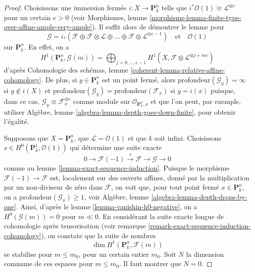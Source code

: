 \begin{proof}
Choisissons une immersion fermée $i : X \to \mathbf{P}^n_k$ telle que
$i^*\mathcal{O}(1) \cong \mathcal{L}^{\otimes e}$ pour un certain $e > 0$
(voir Morphismes, lemme
\ref{morphisms-lemma-finite-type-over-affine-ample-very-ample}).
Il suffit alors de démontrer le lemme pour
$$
\mathcal{G} =
i_*(\mathcal{F} \oplus \mathcal{F} \otimes \mathcal{L} \oplus \ldots
\oplus \mathcal{F} \otimes \mathcal{L}^{\otimes e - 1})
\quad\text{et}\quad \mathcal{O}(1)
$$
sur $\mathbf{P}^n_k$. En effet, on a
$$
H^1(\mathbf{P}^n_k, \mathcal{G}(m)) =
\bigoplus\nolimits_{j = 0, \ldots, e - 1}
H^1(X, \mathcal{F} \otimes \mathcal{L}^{\otimes j + me})
$$
d'après
Cohomologie des schémas, lemme \ref{coherent-lemma-relative-affine-cohomology}.
De plus, si $y \in \mathbf{P}^n_k$ est un point fermé, alors
$\text{profondeur}(\mathcal{G}_y) = \infty$ si $y \not \in i(X)$
et $\text{profondeur}(\mathcal{G}_y) = \text{profondeur}(\mathcal{F}_x)$
si $y = i(x)$ puisque, dans ce cas,
$\mathcal{G}_y \cong \mathcal{F}_x^{\oplus e}$ comme module sur
$\mathcal{O}_{\mathbf{P}^n_k, x}$ et que l'on peut, par exemple, utiliser
Algèbre, lemme \ref{algebra-lemma-depth-goes-down-finite},
pour obtenir l'égalité.

\medskip\noindent
Supposons que $X = \mathbf{P}^n_k$, que $\mathcal{L} = \mathcal{O}(1)$ et que
$k$ soit infini. Choisissons $s \in H^0(\mathbf{P}^1_k, \mathcal{O}(1))$
qui détermine une suite exacte
$$
0 \to \mathcal{F}(-1) \xrightarrow{s} \mathcal{F} \to \mathcal{G} \to 0
$$
comme au lemme \ref{lemma-exact-sequence-induction}. Puisque le morphisme
$\mathcal{F}(-1) \to \mathcal{F}$ est, localement sur des ouverts affines, donné par
la multiplication par un non-diviseur de zéro dans $\mathcal{F}$,
on voit que, pour tout point fermé $x \in \mathbf{P}^n_k$, on a
$\text{profondeur}(\mathcal{G}_x) \geq 1$, voir
Algèbre, lemme \ref{algebra-lemma-depth-drops-by-one}.
Ainsi, d'après le lemme \ref{lemma-vanishin-h0-negative},
on a $H^0(\mathcal{G}(m)) = 0$ pour $m \ll 0$.
En considérant la suite exacte longue de cohomologie après tensorisation
(voir remarque \ref{remark-exact-sequence-induction-cohomology}),
on constate que la suite de nombres
$$
\dim H^1(\mathbf{P}^n_k, \mathcal{F}(m))
$$
se stabilise pour $m \leq m_0$, pour un certain entier $m_0$.
Soit $N$ la dimension commune de ces
espaces pour $m \leq m_0$. Il faut montrer que $N = 0$.


\end{proof}
